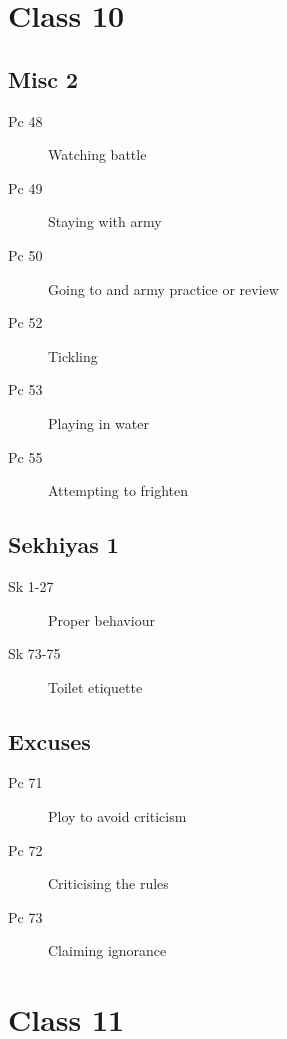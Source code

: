 \documentclass[11pt,oneside]{memoir}
\begin{document}
\clearpage

\chapter{Class 10}

\begin{multicols}{2}

\section{Misc 2}

\begin{description}
\item[Pc 48] Watching battle
\item[Pc 49] Staying with army
\item[Pc 50 \orig] Going to and army practice or review%
\item[Pc 52 \orig] Tickling%
\item[Pc 53] Playing in water
\item[Pc 55] Attempting to frighten
\end{description}

\columnbreak

\section{Sekhiyas 1}

\begin{description}
\item[Sk 1-27] Proper behaviour
\item[Sk 73-75] Toilet etiquette
\end{description}

\section{Excuses}

\begin{description}
\item[Pc 71] Ploy to avoid criticism
\item[Pc 72 \orig] Criticising the rules%
\item[Pc 73] Claiming ignorance
\end{description}

\end{multicols}

\chapter{Class 11}
\end{document}
